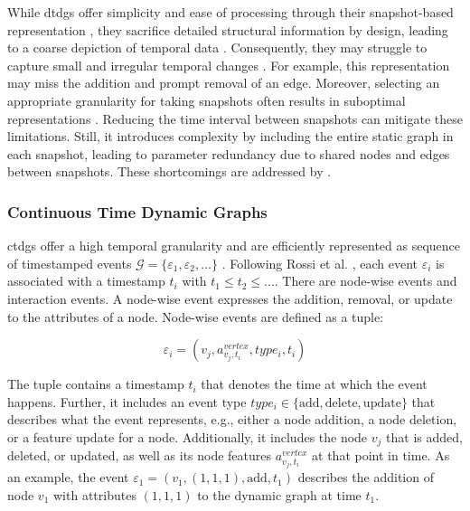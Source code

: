While \glspl{dtdg} offer simplicity and ease of processing through their snapshot-based representation \cite{kazemi_representation_2019}, they sacrifice detailed structural information by design, leading to a coarse depiction of temporal data \cite{trivedi_dyrep_2019, kazemi_representation_2019}. Consequently, they may struggle to capture small and irregular temporal changes \cite{trivedi_dyrep_2019, souza_provably_2022}. For example, this representation may miss the addition and prompt removal of an edge. Moreover, selecting an appropriate granularity for taking snapshots often results in suboptimal representations \cite{trivedi_dyrep_2019}. Reducing the time interval between snapshots can mitigate these limitations. Still, it introduces complexity by including the entire static graph in each snapshot, leading to parameter redundancy due to shared nodes and edges between snapshots. These shortcomings are addressed by .

\subsubsection{Continuous Time Dynamic Graphs}
\label{s_Background_Graphs_CTDGs}

\glspl{ctdg} offer a high temporal granularity \cite{trivedi_dyrep_2019} and are efficiently represented as sequence of timestamped events $\mathcal{G} = \{\varepsilon_{1}, \varepsilon_{2}, ...\}$ \cite{rossi_temporal_2020}. Following Rossi et al. \cite{rossi_temporal_2020}, each event $\varepsilon_{i}$ is associated with a timestamp $t_i$ with $t_1 \leq t_2 \leq ...$. 
There are node-wise events and interaction events. A node-wise event expresses the addition, removal, or update to the attributes of a node. Node-wise events are defined as a tuple:

\begin{equation}
    \varepsilon_{i} = (v_j, a^{vertex}_{v_j, t_i}, type_{i}, t_i)
\end{equation}

The tuple contains a timestamp $t_i$ that denotes the time at which the event happens. Further, it includes an event type ${type_{i} \in \{\mathrm{add}, \mathrm{delete}, \mathrm{update}\}}$ that describes what the event represents, e.g., either a node addition, a node deletion, or a feature update for a node. Additionally, it includes the node $v_j$ that is added, deleted, or updated, as well as its node features $a^{vertex}_{v_j, t_i}$ at that point in time. As an example, the event $\varepsilon_1 = (v_1, (1,1,1), \mathrm{add}, t_1)$ describes the addition of node $v_1$ with attributes $(1,1,1)$ to the dynamic graph at time $t_1$.


